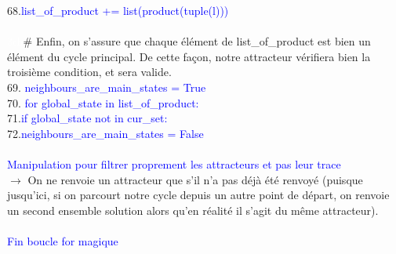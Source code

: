 \documentclass[12pt,a4paper]{article}
\begin{document}
{		68.\qquad\textcolor{blue}{list\_of\_product += list(product(tuple(l)))}\\ \\
	\textcolor{white}{3ch}\# Enfin, on s'assure que chaque élément de list\_of\_product est bien un élément du cycle principal. De cette façon, notre attracteur vérifiera bien la troisième condition, et sera valide.\\
	69. \textcolor{blue}{neighbours\_are\_main\_states = True}\\
	70. \textcolor{blue}{for global\_state in list\_of\_product:}\\
		71.\qquad\textcolor{blue}{if global\_state not in cur\_set:}\\
		72.\qquad\qquad\textcolor{blue}{neighbours\_are\_main\_states = False}\\ \\
	\textcolor{blue}{Manipulation pour filtrer proprement les attracteurs et pas leur trace}\\
	$\rightarrow$ On ne renvoie un attracteur que s'il n'a pas déjà été renvoyé (puisque jusqu'ici, si on parcourt notre cycle depuis un autre 
	point de départ, on renvoie un second ensemble solution alors qu'en réalité il s'agit du même attracteur).\\ \\
	\textcolor{blue}{Fin boucle for magique}\\
}
\end{document}
